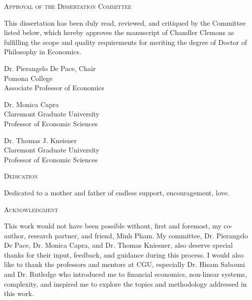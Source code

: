 \documentclass[11pt,a4paper,oldfontcommands]{memoir}
\begin{document}
\thispagestyle{empty}

\begin{center}
\LARGE \textsc{Approval of the Dissertation Committee}    

\normalsize
\hfill \break
This dissertation has been duly read, reviewed, and critiqued by the Committee listed below, which hereby approves the manuscript of Chandler Clemons as fulfilling the scope and quality requirements for meriting the degree of Doctor of Philosophy in Economics.  
\hfill \break
\hfill \break

Dr. Pierangelo De Pace, Chair \\
Pomona College \\
Associate Professor of Economics

\hfill \break
\hfill \break

Dr. Monica Capra \\
Claremont Graduate University \\
Professor of Economic Sciences

\hfill \break
\hfill \break

Dr. Thomas J. Kneisner \\
Claremont Graduate University \\
Professor of Economic Sciences




\end{center}

\clearpage

\thispagestyle{empty}

\begin{center}
\LARGE \textsc{Dedication}    

\normalsize
\hfill \break
Dedicated to a mother and father of endless support, encouragement, love. 





\end{center}

\clearpage

\setcounter{page}{5}

\begin{center}
   

\LARGE \textsc{Acknowledgment}    

\end{center}
\normalsize
\hfill \break
This work would not have been possible without, first and foremost, my co-author, research partner, and friend, Minh Pham. My committee, Dr. Pierangelo De Pace, Dr. Monica Capra, and Dr. Thomas Kniesner, also deserve special thanks for their input, feedback, and guidance during this process. I would also like to thank the professors and mentors at CGU, especially Dr. Hisam Sabouni and Dr. Rutledge who introduced me to financial economics, non-linear systems, complexity, and inspired me to explore the topics and methodology addressed in this work.  
\end{document}
